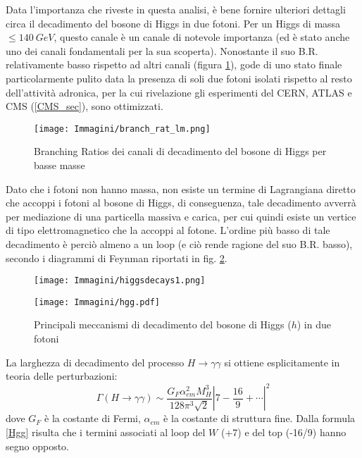 Data l'importanza che riveste in questa analisi, è bene fornire ulteriori dettagli circa il decadimento del bosone di Higgs 
in due fotoni.
\newline
Per un Higgs di massa $\le 140 ~GeV$, questo canale è un canale di notevole importanza (ed è stato anche uno dei canali fondamentali per la sua scoperta).
Nonostante il suo B.R. relativamente basso rispetto ad altri canali (figura \ref{branch_rat_lm}), gode di uno stato finale particolarmente pulito data la presenza di soli
due fotoni isolati rispetto al resto dell'attività adronica, per la cui rivelazione gli esperimenti del CERN, ATLAS e CMS (\ref{CMS_sec}),  sono ottimizzati.

\begin{figure}[!htbp]
\begin{center}
\texttt{[image: Immagini/branch\_rat\_lm.png]}
\end{center}
\caption{Branching Ratios dei canali di decadimento del bosone di Higgs per basse masse}
\label{branch_rat_lm}
\end{figure}

Dato che i fotoni non hanno massa, non esiste un termine di Lagrangiana diretto che accoppi i fotoni al bosone di Higgs, 
di conseguenza, tale decadimento avverrà per mediazione di una particella massiva e carica, per cui quindi esiste un vertice di tipo
elettromagnetico che la accoppi al fotone.
L'ordine più basso di tale decadimento è perciò almeno a un loop (e ciò rende ragione del suo B.R. basso), secondo i diagrammi di Feynman 
riportati in fig. \ref{hgg}.

\begin{figure}[!htbp]
\begin{center}
\texttt{[image: Immagini/higgsdecays1.png]}
\end{center}
\begin{center}
\texttt{[image: Immagini/hgg.pdf]}
\end{center}
\caption[Decadimento $h\rightarrow\gamma\gamma$]{Principali meccanismi di decadimento del bosone di Higgs ($h$) in due fotoni}
\label{hgg}
\end{figure}

La larghezza di decadimento del processo $H\rightarrow\gamma\gamma$ si ottiene esplicitamente in teoria delle perturbazioni:
\begin{equation}\label{Hgg}
 \Gamma(H\rightarrow\gamma\gamma)\sim\dfrac{G_{F}\alpha_{em}^{2}M^{3}_H}{128\pi^{3}\sqrt{2}}|7-\frac{16}{9}+\cdots|^{2}
\end{equation}
dove $G_F$ è la costante di Fermi, $\alpha_{em}$ è la costante di struttura fine. Dalla formula \ref{Hgg} risulta che i termini 
associati al loop del $W$ (+7) e del top (-16/9) hanno segno opposto.
 
